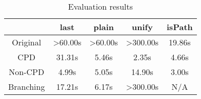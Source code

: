 \begin{table}
  \centering
  \begin{tabular}{c||c|c||c||c}
                   & last & plain & unify & isPath \\
  \hline\hline
  Original         & >60.00s & >60.00s & >300.00s & 19.86s \\
  \hline
  CPD              & 31.31s & 5.46s & 2.35s & 4.66s \\
  \hline
  Non-CPD          & 4.99s  & 5.05s & 14.90s & 3.00s \\
  \hline
  Branching        & 17.21s  & 6.17s & >300.00s & N/A \\
  \hline
  \end{tabular}

  \caption{Evaluation results}
  \label{tbl:eval}
\end{table}







